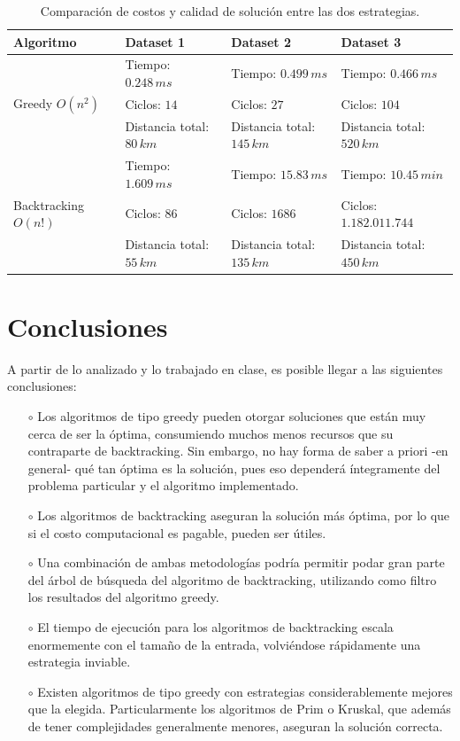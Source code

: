 \documentclass[10 pt, A4paper]{article}
\begin{document}
	\begin{table}[h!]
		\centering
		\begin{tabular}{|p{3.8cm} | p{3.5cm} | p{3.6cm} | p{3.6cm}|}
			\hline
			Algoritmo & Dataset 1 & Dataset 2 & Dataset 3 \\
			\hline
			\multirow{3}{1em}{Greedy $O(n^2)$} & Tiempo: $0.248\,ms$ & Tiempo: $0.499\,ms$& Tiempo: $0.466\,ms$ \\ & Ciclos: $14$ & Ciclos: $27$ & Ciclos: $104$ \\ & Distancia total: $80\,km$ & Distancia total: $145\,km$& Distancia total: $520\,km$ \\
			\hline
			\multirow{3}{1em}{Backtracking $O(n!)$} & Tiempo: $1.609\,ms$& Tiempo: $15.83\,ms$& Tiempo: $10.45\,min$\\ & Ciclos: $86$ & Ciclos: $1686$ & Ciclos: $1.182.011.744$ \\ & Distancia total: $55\,km$& Distancia total: $135\,km$& Distancia total: $450\,km$\\
			\hline
		\end{tabular}
		\caption{Comparación de costos y calidad de solución entre las dos estrategias.}
		\label{table}
	\end{table}
	
	\section*{Conclusiones}
	A partir de lo analizado y lo trabajado en clase, es posible llegar a las siguientes conclusiones:
	\begin{itemize}
		\item[$\circ$] Los algoritmos de tipo greedy pueden otorgar soluciones que están muy cerca de ser la óptima, consumiendo muchos menos recursos que su contraparte de backtracking. Sin embargo, no hay forma de saber a priori -en general- qué tan óptima es la solución, pues eso dependerá íntegramente del problema particular y el algoritmo implementado.
		\item[$\circ$] Los algoritmos de backtracking aseguran la solución más óptima, por lo que si el costo computacional es pagable, pueden ser útiles.
		\item[$\circ$] Una combinación de ambas metodologías podría permitir podar gran parte del árbol de búsqueda del algoritmo de backtracking, utilizando como filtro los resultados del algoritmo greedy.
		\item[$\circ$] El tiempo de ejecución para los algoritmos de backtracking escala enormemente con el tamaño de la entrada, volviéndose rápidamente una estrategia inviable.
		\item[$\circ$] Existen algoritmos de tipo greedy con estrategias considerablemente mejores que la elegida. Particularmente los algoritmos de Prim o Kruskal, que además de tener complejidades generalmente menores, aseguran la solución correcta.
	\end{itemize}
	
	
\end{document}
